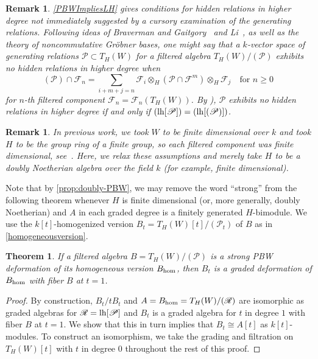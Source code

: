 \documentclass[11pt]{amsart}
\numberwithin{equation}{section}
\newtheorem{thm}[equation]{Theorem}
\newtheorem{remark}[equation]{Remark}
\newcommand{\BBB}{B}
\newcommand{\sA}{A }
\newcommand{\RR}{\mathscr{R} }
\newcommand{\PP}{\mathscr{P}}
\newcommand{\LH}{{\rm{lh}}}
\newcommand{\hh}{\rm{hom}}
\renewcommand{\_}[1]{\mbox{$_{\left( #1 \right)}$}}
\newcommand{\F}{\mathcal F}
\newcommand{\ot}{\otimes}
\begin{document}
{ 

    \begin{remark}
\label{HiddenRelations}
      {\em
        \cref{PBWImpliesLH} gives conditions for hidden
        relations
        in higher degree not immediately suggested by a cursory examination of the
generating relations.  
Following ideas of Braverman and
Gaitgory~\cite{Braverman-Gaitsgory} and Li~\cite{Li}, as well
as the theory of noncommutative
Gr\"obner
bases,
one might say
  that a $k$-vector space of generating relations $\PP\subset T_H(W)$
      for a filtered algebra $T_{H}(W)/(\PP)$
      exhibits {\em no hidden relations in higher degree}
     when  $$  (\PP) \cap 
\F_n
= \sum_{i+m + j = n} \F_i\ot_H (\PP\cap \F^m) \ot_H \F_j 
\quad\text{for } n\geq 0 
\,  $$
for $n$-th filtered component $\F_n=\F_n(T_{H}(W))$.
By \cite[Proposition 1.7]{Li}),
    $\PP$ exhibits no hidden relations in higher
    degree
    if and only if 
    $(\LH[\PP])=(\LH[(\PP)])$.
  }
\end{remark}

\begin{remark}{\em
In previous work, 
we took $W$ to be finite dimensional over $k$ and took $H$ to
be the group ring of a finite group, so each filtered component was finite
dimensional, see~\cite{SW-Koszul}. 
Here, we relax these assumptions and merely take
$H$ to be a doubly Noetherian algebra
over the field $k$ (for example, finite dimensional).
}
\end{remark}


Note that by \cref{prop:doubly-PBW}, 
we may remove the word ``strong'' from the following theorem
whenever $H$ is finite dimensional (or, more generally, doubly Noetherian) and 
$\sA$ in each graded degree is a finitely generated $H$-bimodule.
We use the $k[t]$-homogenized version 
$\BBB_t=T_{H}(W)[t]/(\PP_t)$
of $\BBB$ as in \cref{homogeneousversion}. 


\begin{thm}\label{PBWImpliesDeformation}
   If a filtered algebra
   $\BBB=T_{H}(W)/(\PP)$
   is a strong PBW deformation of its homogeneous version $\BBB_{\hh}$,
then 
$\BBB_t$ is a graded deformation of $\BBB_{\hh}$ with fiber $\BBB$
at $t=1$.
  \end{thm}
  \begin{proof}
 By construction,
    $\BBB_t/t\BBB_t$ and $\sA=\BBB_{\hh}=T_H(W)/(\RR)$ are isomorphic as graded algebras
for $\RR = \LH [ \PP]$
and $\BBB_t$ is a graded algebra for $t$ in degree $1$ with fiber
$\BBB$ at $t=1$.
We show that this in turn implies that 
$\BBB_t \cong
\sA[t]$  as $k[t]$-modules.
To construct an isomorphism, we
take the grading and filtration on $T_{H}(W)[t]$ with $t$ in
    degree $0$ throughout the rest of this proof.
 


\end{proof}}
\end{document}
